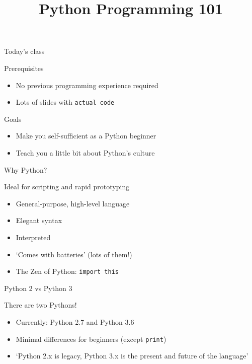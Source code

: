 

\title{Python Programming 101}



\maketitle

\begin{frame}{Today's class}
    \begin{block}{Prerequisites}
        \begin{itemize}
            \item No previous programming experience required
            \item Lots of slides with \texttt{actual code}
        \end{itemize}
    \end{block}
    \vfill
    \begin{block}{Goals}
        \begin{itemize}
            \item Make you self\hyp{}sufficient as a Python beginner
            \item Teach you a little bit about Python's culture
        \end{itemize}
    \end{block}
\end{frame}

\begin{frame}[fragile]{Why Python?}
    \begin{block}{Ideal for scripting and rapid prototyping}
        \begin{itemize}
            \item General\hyp{}purpose, high\hyp{}level language
            \item Elegant syntax
            \item Interpreted
            \item `Comes with batteries' (lots of them!)
            \item The Zen of Python: \texttt{import this}
        \end{itemize}
    \end{block}
\end{frame}

\begin{frame}{Python 2 vs Python 3}
    \begin{block}{There are two Pythons!}
        \begin{itemize}
            \item Currently: Python 2.7 and Python 3.6
            \item Minimal differences for beginners
                  (except \texttt{print})
            \item `Python 2.x is legacy, Python 3.x is the present and future of
                   the language'
        \end{itemize}
    \end{block}
\end{frame}

